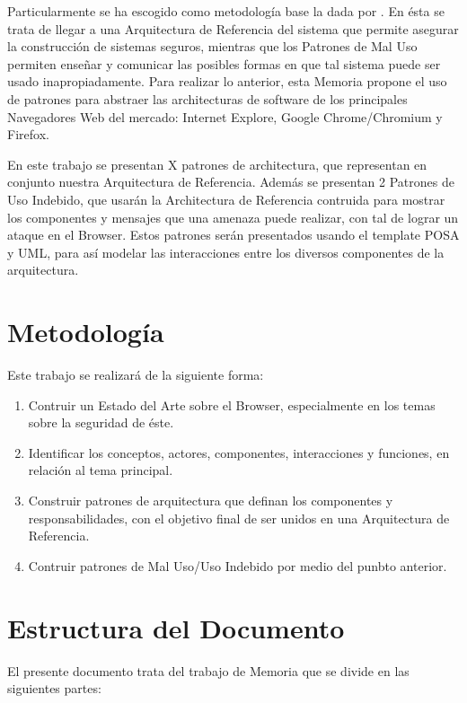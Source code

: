 Particularmente se ha escogido como metodología base la dada por \cite{fernandez2013security}. En ésta se trata de llegar a una Arquitectura de Referencia del sistema que permite asegurar la construcción de sistemas seguros, mientras que los Patrones de Mal Uso permiten enseñar y comunicar las posibles formas en que tal sistema puede ser usado inapropiadamente. Para realizar lo anterior, esta Memoria propone el uso de patrones para abstraer las architecturas de software de los principales Navegadores Web del mercado: Internet Explore, Google Chrome/Chromium y Firefox.

En este trabajo se presentan X patrones de architectura, que representan en conjunto nuestra Arquitectura de Referencia. Además se presentan 2 Patrones de Uso Indebido, que usarán la Architectura de Referencia contruida para mostrar los componentes y mensajes que una amenaza puede realizar, con tal de lograr un ataque en el Browser. Estos patrones serán presentados usando el template POSA \cite{buschman1996system} y UML, para así modelar las interacciones entre los diversos componentes de la arquitectura.

\section{Metodología}
\label{chap1:Met}
Este trabajo se realizará de la siguiente forma:
\begin{enumerate}
	\item Contruir un Estado del Arte sobre el Browser, especialmente en los temas sobre la seguridad de éste.
	\item Identificar los conceptos, actores, componentes, interacciones y funciones, en relación al tema principal.
	\item Construir patrones de arquitectura que definan los componentes y responsabilidades, con el objetivo final de ser unidos en una Arquitectura de Referencia.
	\item Contruir patrones de Mal Uso/Uso Indebido por medio del punbto anterior.
\end{enumerate}

\section{Estructura del Documento}
\label{chap1:estruct}

El presente documento trata del trabajo de Memoria que se divide en las siguientes partes:

